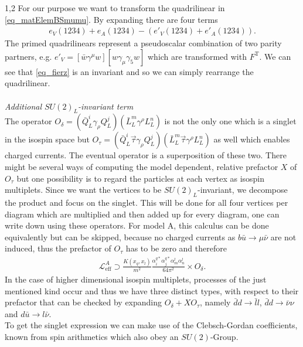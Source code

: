 \documentclass[11pt,a4paper,twoside]{article}
\numberwithin{equation}{section}
\begin{document}
\begin{spacing}{1,2}
\noindent For our purpose we want to transform the quadrilinear in \eqref{eq_matElemBSmumu}. By expanding there are four terms
\begin{align}
 e_V(1234)+e_A(1234)-\left(e'_V(1234) + e'_A(1234)\right).
 \label{eq_fierz}
\end{align}
The primed quadrilinears represent a pseudoscalar combination of two parity partners, e.g. $e'_V = \left[\bar w\gamma^\mu w\right]\left[w\gamma_\mu\gamma_5w\right]$
which are transformed with $F^\text{T}$. We can see that \eqref{eq_fierz} is an invariant and so we can simply rearrange the quadrilinear.
\\ \\ \noindent \textit{Additional $SU(2)_L$-invariant term}\\
\noindent The operator $O_\delta=\left(\bar Q_L^i \gamma_\rho Q_L^j\right)\left(\bar L_L^m \gamma^\rho L_L^n\right)$ is not the only one which is a singlet
in the isospin space but $O_\tau=\left(\bar Q_L^i\vec \tau \gamma_\rho Q_L^j\right)\left(\bar L_L^m\vec \tau \gamma^\rho L_L^n\right)$ as well which enables
charged currents. The eventual operator is a superposition of these two. There might be several ways of computing the model dependent, relative 
prefactor $X$ of $O_\tau$  but one possibility is to regard the particles at each vertex as isospin multiplets. Since we want the vertices to be 
$SU(2)_L$-invariant, we 
decompose the product and focus on the singlet. This will be done for all four vertices per diagram which are multiplied and then added up for every diagram,
one can write down using these operators. For model A, this calculus can be done equivalently but can be skipped, because no charged currents as 
$b \bar u \rightarrow \mu \bar \nu$ are not induced, thus the prefactor of $O_\tau$ has to be zero and therefore 
\begin{align}
  \mathcal{L}^A_\text{eff} \supset \frac{K(x_q,x_l)}{m^2}\frac{\alpha_i^{q*} \alpha_j^{q*} \alpha_m^l \alpha_n^l}{64\pi^2} \times O_\delta.
 \label{eq_LagBSmumuModA}
\end{align}
In the case of higher dimensional isospin multiplets, processes of the just mentioned kind occur and thus we have three distinct types, with respect to 
their prefactor that can be checked by expanding $O_\delta + X O_\tau$, namely $\bar d d\rightarrow \bar l l$, $\bar d d \rightarrow \bar\nu \nu$ and 
$d \bar u\rightarrow l\bar\nu$. \\
\noindent To get the singlet expression we can make use of the Clebsch-Gordan coefficients, known from spin arithmetics which also obey an $SU(2)$-Group.

\end{spacing}
\end{document}
